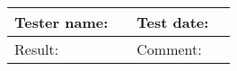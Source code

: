\begin{tabularx}{\textwidth}{|p{3cm}X|p{3cm}X|}\hline
	Tester name: &  & Test date: & \\\hline
	Result: &  \pass & Comment: & \\\hline
\end{tabularx}





